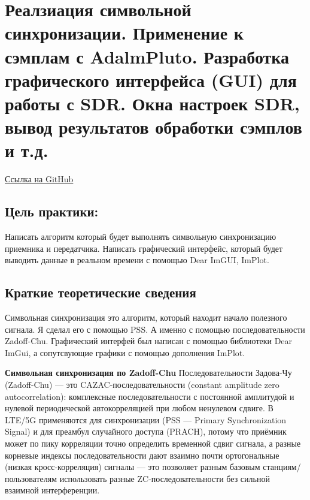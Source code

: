 \chapter[Реалзиация символьной синхронизации. Применение к сэмплам с
AdalmPluto. Разработка графического интерфейса (GUI) для работы с SDR.
Окна настроек SDR, вывод результатов обработки сэмплов и т.д.]{Реалзиация символьной синхронизации. Применение к сэмплам с
AdalmPluto. Разработка графического интерфейса (GUI) для работы с SDR.
Окна настроек SDR, вывод результатов обработки сэмплов и т.д.}

\begin{leftbar}
    \href{https://github.com/someotb/sdr}{Ссылка на GitHub}
\end{leftbar}

\section*{Цель практики:}

Написать алгоритм который будет выполнять символьную синхронизацию приемника и передатчика. Написать графический интерфейс, который будет
выводить данные в реальном времени с помощью Dear ImGUI, ImPlot.

\section*{Краткие теоретические сведения}

Символьная синхронизация это алгоритм, который находит начало полезного сигнала. Я сделал его с помощью PSS.
А именно с помощью последовательности Zadoff-Chu. Графический интерфей был написан с помощью библиотеки Dear ImGui, а сопутсвующие графики
с помощью дополнения ImPlot.

\vspace{10pt}

\textbf{Символьная синхронизация по Zadoff-Chu}\newline
Последовательности Задова-Чу (Zadoff-Chu) — это CAZAC-последовательности (constant amplitude zero autocorrelation): комплексные последовательности с постоянной амплитудой и нулевой периодической автокорреляцией при любом ненулевом сдвиге. В LTE/5G применяются для синхронизации (PSS — Primary Synchronization Signal) и для преамбул случайного доступа (PRACH), потому что приёмник может по пику корреляции точно определить временной сдвиг сигнала, а разные корневые индексы последовательности дают взаимно почти ортогональные (низкая кросс-корреляция) сигналы — это позволяет разным базовым станциям/пользователям использовать разные ZC-последовательности без сильной взаимной интерференции.

